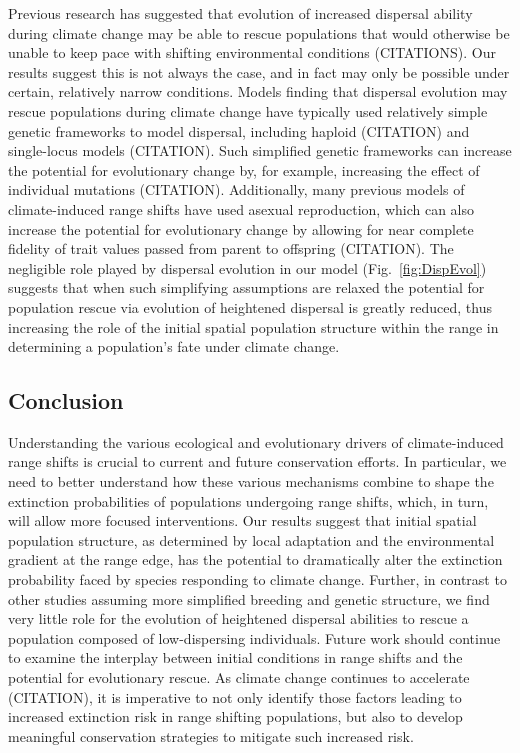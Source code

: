 \documentclass[11pt, oneside]{article}
\begin{document}
Previous research has suggested that evolution of increased dispersal ability during climate change may be able to rescue populations that would otherwise be unable to keep pace with shifting environmental conditions (CITATIONS). Our results suggest this is not always the case, and in fact may only be possible under certain, relatively narrow conditions. Models finding that dispersal evolution may rescue populations during climate change have typically used relatively simple genetic frameworks to model dispersal, including haploid (CITATION) and single-locus models (CITATION). Such simplified genetic frameworks can increase the potential for evolutionary change by, for example, increasing the effect of individual mutations (CITATION). Additionally, many previous models of climate-induced range shifts have used asexual reproduction, which can also increase the potential for evolutionary change by allowing for near complete fidelity of trait values passed from parent to offspring (CITATION). The negligible role played by dispersal evolution in our model (Fig.~\ref{fig:DispEvol}) suggests that when such simplifying assumptions are relaxed the potential for population rescue via evolution of heightened dispersal is greatly reduced, thus increasing the role of the initial spatial population structure within the range in determining a population's fate under climate change.

\subsection{Conclusion}
Understanding the various ecological and evolutionary drivers of climate-induced range shifts is crucial to current and future conservation efforts. In particular, we need to better understand how these various mechanisms combine to shape the extinction probabilities of populations undergoing range shifts, which, in turn, will allow more focused interventions. Our results suggest that initial spatial population structure, as determined by local adaptation and the environmental gradient at the range edge, has the potential to dramatically alter the extinction probability faced by species responding to climate change. Further, in contrast to other studies assuming more simplified breeding and genetic structure, we find very little role for the evolution of heightened dispersal abilities to rescue a population composed of low-dispersing individuals. Future work should continue to examine the interplay between initial conditions in range shifts and the potential for evolutionary rescue. As climate change continues to accelerate (CITATION), it is imperative to not only identify those factors leading to increased extinction risk in range shifting populations, but also to develop meaningful conservation strategies to mitigate such increased risk.



\end{document}
